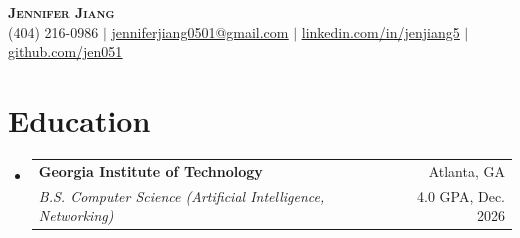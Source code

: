 \documentclass[letterpaper,11pt]{article}
\makeatletter
\newcommand{\resumeItem}[1]{
  \item\small{
    {#1 \vspace{-2pt}}
  }
}
\newcommand{\resumeSpecialSubheading}[4]{
  \vspace{-2pt}\item
    \begin{tabular*}{0.97\textwidth}[t]{l@{\extracolsep{\fill}}r}
      \textbf{\small#1} & \small #2 \\
      \textit{\small#3} & \small #4 \\
    \end{tabular*}\vspace{-5pt}
}
\newcommand{\resumeSubHeadingListStart}{\begin{itemize}[leftmargin=0.15in, label={}]}
\newcommand{\resumeSubHeadingListEnd}{\end{itemize}}
\makeatother
\begin{document}
\begin{center}
    \textbf{\huge \scshape Jennifer Jiang} \\ \vspace{2pt}
    \small (404) 216-0986 $|$ \href{mailto:jenniferjiang0501@gmail.com}{\underline{jenniferjiang0501@gmail.com}} $|$ 
    \href{https://www.linkedin.com/in/jenjiang5/}{\underline{linkedin.com/in/jenjiang5}} $|$
    \href{https://github.com/jen051}{\underline{github.com/jen051}}
\end{center}


\section{Education}
  \resumeSubHeadingListStart
    \resumeSpecialSubheading
      {Georgia Institute of Technology}{Atlanta, GA}
      {B.S. Computer Science (Artificial Intelligence, Networking)}{4.0 GPA, Dec. 2026}
  \resumeSubHeadingListEnd


\end{document}
